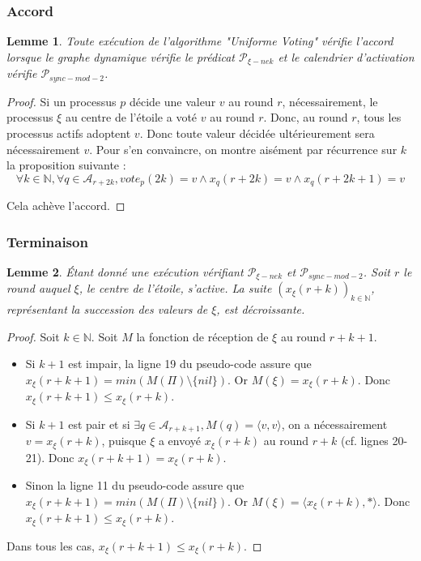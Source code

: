 \documentclass{article}
\newtheorem{lemma}{Lemme}[section]
\begin{document}
\subsubsection{Accord}

\begin{lemma}
	Toute exécution de l'algorithme "Uniforme Voting" vérifie l'accord lorsque le graphe dynamique vérifie le prédicat $\mathcal{P}_{\xi-nek}$
	et le calendrier d'activation vérifie $\mathcal{P}_{sync-mod-2}$.
\end{lemma}
\begin{proof}
	Si un processus $p$ décide une valeur $v$ au round $r$, nécessairement, le processus $\xi$ au centre de l'étoile a voté $v$ au round $r$.
	Donc, au round $r$, tous les processus actifs adoptent $v$.
	Donc toute valeur décidée ultérieurement sera nécessairement $v$. Pour s'en convaincre, on montre aisément par récurrence sur $k$ la proposition suivante :
	$$\forall k \in \mathds{N}, \forall q \in \mathcal{A}_{r+2k}, vote_p(2k) = v \wedge x_q(r+2k) = v \wedge x_q(r+2k+1) = v$$

	Cela achève l'accord.
\end{proof}

\subsubsection{Terminaison}

	\begin{lemma}
		Étant donné une exécution vérifiant $\mathcal{P}_{\xi-nek}$ et $\mathcal{P}_{sync-mod-2}$.
		Soit $r$ le round auquel $\xi$, le centre de l'étoile, s'active.
		La suite $(x_\xi(r+k))_{k \in \mathds{N}}$, représentant la succession des valeurs de $\xi$, est décroissante.
	\end{lemma}
	\begin{proof}
		Soit $k \in \mathds{N}$. Soit $M$ la fonction de réception de $\xi$ au round $r+k+1$.
		\begin{itemize}

			\item Si $k+1$ est impair, la ligne 19 du pseudo-code assure que $x_\xi(r+k+1) = min(M(\Pi) \setminus \{nil\})$.
				Or $M(\xi) = x_\xi(r+k)$.  Donc $x_\xi(r+k+1) \leq x_\xi(r+k)$.
			\item Si $k+1$ est pair et si $\exists q \in \mathcal{A}_{r+k+1}, M(q) = \langle v, v \rangle$,
				on a nécessairement $v = x_\xi(r+k)$, puisque $\xi$ a envoyé $x_\xi(r+k)$ au round $r+k$ (cf. lignes 20-21).
				Donc $x_\xi(r+k+1) = x_\xi(r+k)$.
			\item Sinon la ligne 11 du pseudo-code assure que $x_\xi(r+k+1) = min(M(\Pi) \setminus \{nil\})$.
				Or $M(\xi) = \langle x_\xi(r+k), * \rangle$.
				Donc $x_\xi(r+k+1) \leq x_\xi(r+k)$.

		\end{itemize}
		Dans tous les cas, $x_\xi(r+k+1) \leq x_\xi(r+k)$.
	\end{proof}
		
\end{document}
